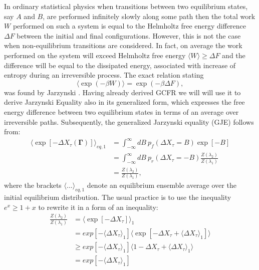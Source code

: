 \documentclass[a4paper,12pt]{article}
\begin{document}
In ordinary statistical physics when transitions between two equilibrium states, say $A$ and $B$, are performed infinitely slowly along some path then the total work $W$ performed on such a system is equal to the Helmholtz free energy difference $\Delta F$ between the initial and final configurations. However, this is not the case when non-equilibrium transitions are considered. In fact, on average the work performed on the system will exceed Helmholtz free energy $ \langle  W \rangle \geq \Delta F $ and the difference will be equal to the dissipated energy, associated with increase of entropy during an irreversible process. The exact relation stating
\begin{equation}
\label{JarzynskiInequality}
  \langle \exp(-\beta W) \rangle = \exp(-\beta  \Delta F),
\end{equation}
was found by Jarzynski \cite{Jarzynski:1997uj}.
Having already derived GCFR we will will use it to derive Jarzynski Equality also in its generalized form, which expresses the free energy difference between two equilibrium states in terms of an average over irreversible paths.
Subsequently, the generalized Jarzynski equality (GJE) follows from:
\begin{equation}
\begin{aligned}
  \langle \exp[-\Delta X_{\tau}(\bm{\Gamma})] \rangle_{eq,1} 
  &= \int_{-\infty}^{\infty} dB\ p_f(\Delta X_\tau =B)\exp[-B]\\
 &= \int_{-\infty}^{\infty} dB\ p_r(\Delta X_\tau =-B)\frac{Z(\lambda_2)}{Z(\lambda_1)}\\
 &=\frac{Z(\lambda_2)}{Z(\lambda_1)},
\end{aligned}
\end{equation}
where the brackets $\langle ... \rangle_{eq,1}$ denote an equilibrium ensemble average over the initial equilibrium distribution.
The usual practice is to use the inequality $e^x \geq 1+x $ to rewrite it in a form of an inequality:
\begin{equation}
\begin{aligned}
  \frac{Z(\lambda_2)}{Z(\lambda_1)} &=\langle \exp[-\Delta X_\tau ]\rangle_1 \\
  &=exp[-\langle\Delta X_\tau \rangle_1]\langle \exp[-\Delta X_\tau + \langle \Delta X_\tau \rangle_1]\rangle \\
  &\geq exp[-\langle\Delta X_\tau \rangle_1]\langle 1- \Delta X_\tau + \langle \Delta X_\tau \rangle_1 \rangle \\
  &=exp[-\langle\Delta X_\tau \rangle_1]
\end{aligned}
\end{equation}
\end{document}

